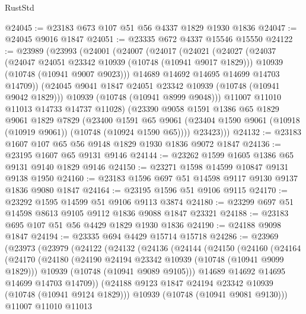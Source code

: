 \begin{lexlean}{RustStd}
\begin{coremodule}
@24045 := @23183 @673 @107 @51 @56 @4337 @1829 @1930 @1836
@24047 := @24045 @9016 @1847
@24051 := @23335 @672 @4337 @15546 @15550
@24122 := @23989
    (@23993
      (@24001
        (@24007
          (@24017
            (@24021
              (@24027
                (@24037
                  (@24047 @24051 @23342 @10939 (@10748 (@10941 @9017 @1829)))
                  @10939
                  (@10748 (@10941 @9007 @9023)))
                @14689
                @14692
                @14695
                @14699
                @14703
                @14709))
            (@24045 @9041 @1847 @24051 @23342 @10939 (@10748 (@10941 @9042 @1829)))
            @10939
            (@10748 (@10941 @8999 @9048)))
          @11007
          @11010
          @11013
          @14733
          @14737
          @11028)
        (@23390
          @9058
          @1591
          @1386
          @65
          @1829
          @9061
          @1829
          @7829
          (@23400
            @1591
            @65
            @9061
            (@23404 @1590 @9061 (@10918 (@10919 @9061)) (@10748 (@10924 @1590 @65))))
          @23423)))
@24132 := @23183 @1607 @107 @65 @56 @9148 @1829 @1930 @1836 @9072 @1847
@24136 := @23195 @1607 @65 @9131 @9146
@24144 := @23262 @1599 @1605 @1386 @65 @9131 @9140 @1829 @9146
@24150 := @23271 @1598 @14599 @10847 @9131 @9138 @1950
@24160 := @23183 @1596 @697 @51 @14598 @9117 @9130 @9137 @1836 @9080 @1847
@24164 := @23195 @1596 @51 @9106 @9115
@24170 := @23292 @1595 @14599 @51 @9106 @9113 @3874
@24180 := @23299 @697 @51 @14598 @8613 @9105 @9112 @1836 @9088 @1847 @23321
@24188 := @23183 @695 @107 @51 @56 @4429 @1829 @1930 @1836
@24190 := @24188 @9098 @1847
@24194 := @23335 @694 @4429 @15714 @15718
@24286 := @23969
    (@23973
      (@23979
        (@24122
          (@24132
            (@24136
              (@24144
                (@24150
                  (@24160
                    (@24164
                      (@24170
                        (@24180
                          (@24190 @24194 @23342 @10939 (@10748 (@10941 @9099 @1829)))
                          @10939
                          (@10748 (@10941 @9089 @9105)))
                        @14689
                        @14692
                        @14695
                        @14699
                        @14703
                        @14709))
                    (@24188 @9123 @1847 @24194 @23342 @10939 (@10748 (@10941 @9124 @1829)))
                    @10939
                    (@10748 (@10941 @9081 @9130)))
                  @11007
                  @11010
                  @11013

\end{coremodule}
\end{lexlean}
